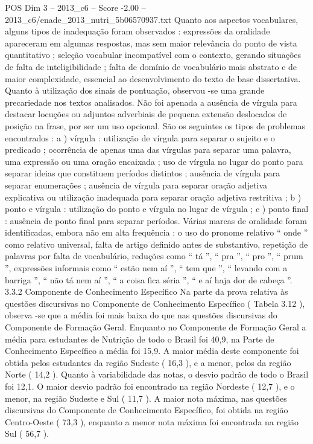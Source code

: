 \begin{textsample}{POS Dim 3 – 2013\_c6 – Score -2.00 – 2013\_c6/enade\_2013\_nutri\_5b06570937.txt}
Quanto aos aspectos vocabulares, alguns tipos de inadequação foram observados : expressões da oralidade apareceram em algumas respostas, mas sem maior relevância do ponto de vista quantitativo ; seleção vocabular incompatível com o contexto, gerando situações de falta de inteligibilidade ; falta de domínio de vocabulário mais abstrato e de maior complexidade, essencial ao desenvolvimento do texto de base dissertativa.
Quanto à utilização dos sinais de pontuação, observou -se uma grande precariedade nos textos analisados.
Não foi apenada a ausência de vírgula para destacar locuções ou adjuntos adverbiais de pequena extensão deslocados de posição na frase, por ser um uso opcional.
São os seguintes os tipos de problemas encontrados : a ) vírgula : utilização de vírgula para separar o sujeito e o predicado ; ocorrência de apenas uma das vírgulas para separar uma palavra, uma expressão ou uma oração encaixada ; uso de vírgula no lugar do ponto para separar ideias que constituem períodos distintos ; ausência de vírgula para separar enumerações ; ausência de vírgula para separar oração adjetiva explicativa ou utilização inadequada para separar oração adjetiva restritiva ; b ) ponto e vírgula : utilização do ponto e vírgula no lugar de vírgula ; c ) ponto final : ausência de ponto final para separar períodos.
Várias marcas de oralidade foram identificadas, embora não em alta frequência : o uso do pronome relativo “ onde ” como relativo universal, falta de artigo definido antes de substantivo, repetição de palavras por falta de vocabulário, reduções como “ tá ”, “ pra ”, “ pro ”, “ prum ”, expressões informais como “ estão nem aí ”, “ tem que ”, “ levando com a barriga ”, “ não tá nem aí ”, “ a coisa fica séria ”, “ e aí haja dor de cabeça ”. 3.3.2 Componente de Conhecimento Específico Na parte da prova relativa às questões discursivas no Componente de Conhecimento Específico ( Tabela 3.12 ), observa -se que a média foi mais baixa do que nas questões discursivas do Componente de Formação Geral.
Enquanto no Componente de Formação Geral a média para estudantes de Nutrição de todo o Brasil foi 40,9, na Parte de Conhecimento Específico a média foi 15,9.
A maior média deste componente foi obtida pelos estudantes da região Sudeste ( 16,3 ), e a menor, pelos da região Norte ( 14,2 ).
Quanto à variabilidade das notas, o desvio padrão de todo o Brasil foi 12,1.
O maior desvio padrão foi encontrado na região Nordeste ( 12,7 ), e o menor, na região Sudeste e Sul ( 11,7 ).
A maior nota máxima, nas questões discursivas do Componente de Conhecimento Específico, foi obtida na região Centro-Oeste ( 73,3 ), enquanto a menor nota máxima foi encontrada na região Sul ( 56,7 ).

\end{textsample}
